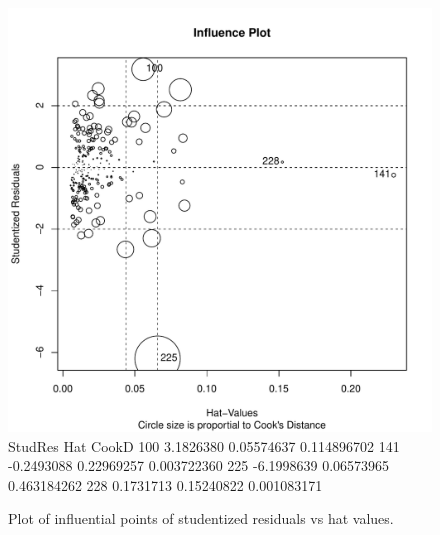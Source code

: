 \documentclass[11pt]{article}\usepackage[]{graphicx}\usepackage[]{color}
\makeatletter
\def\maxwidth{ %
  \ifdim\Gin@nat@width>\linewidth
    \linewidth
  \else
    \Gin@nat@width
  \fi
}
\makeatother
\begin{document}
\begin{figure}[h!] 
\begin{center}

\includegraphics[width=\maxwidth]{figure/unnamed-chunk-13-1} 
       StudRes        Hat       CookD
100  3.1826380 0.05574637 0.114896702
141 -0.2493088 0.22969257 0.003722360
225 -6.1998639 0.06573965 0.463184262
228  0.1731713 0.15240822 0.001083171

\caption{Plot of influential points of studentized residuals vs hat values.}
\label{influential-points}
\end{center} 
\end{figure}
\end{document}
